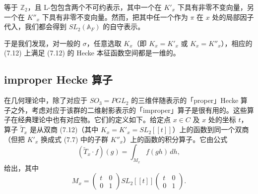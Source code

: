 
等于 $\mathbb{Z}_2$，且 L-包包含两个不可约表示，其中一个在 $K'_x$ 下具有非零不变向量，另一个在 $K''_x$ 下具有非零不变向量。然而，把其中任一个作为 $\pi$ 在 $x$ 处的局部因子代入，我们都会得到 $SL_2(\mathbb{A}_F)$ 的自守表示。

于是我们发现，对一般的 $\sigma$，任意选取 $K_x$（即 $K_x=K'_x$ 或 $K_x=K''_x$），相应的 (7.12) 上满足 (7.12) 的 Hecke 本征函数空间都是一维的。

\subsection{improper Hecke 算子}

在几何理论中，除了对应于 $SO_3=PGL_2$ 的三维伴随表示的「proper」Hecke 算子之外，考虑对应于该群的二维射影表示的「improper」算子是很有用的。这些算子在经典理论中也有对应物。它们的定义如下。给定点 $x\in C$ 及 $x$ 处的坐标 $t$，算子 $\widetilde{T}_x$ 是从双商 (7.12)（其中 $K_x=K'_x=SL_2[[t]]$）上的函数到同一个双商（但把 $K'_x$ 换成式 (7.7) 中的子群 $K''_x$）上的函数的积分算子。它由公式
\begin{equation}\tag{7.14}
(\widetilde{T}_x\cdot f)(g)=\int_{M_x}f(gh)\,dh,
\end{equation}
给出，其中
\[
M_x=\begin{pmatrix}t&0\\ 0&1\end{pmatrix}SL_2[[t]]\begin{pmatrix}t&0\\ 0&1\end{pmatrix}.
\]

